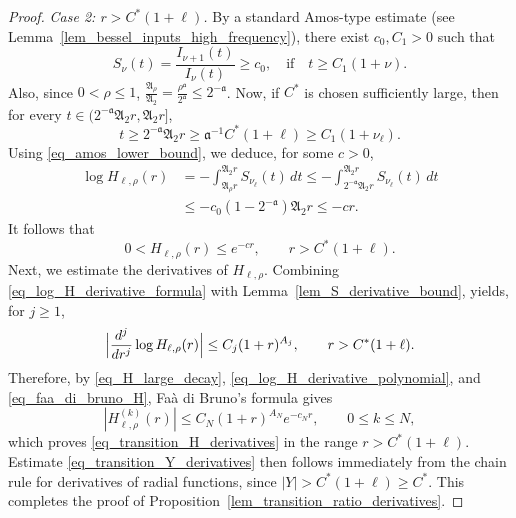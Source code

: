 \documentclass[12pt]{amsart}
\begin{document}
\begin{proof}
\textit{Case 2: $r>C^*(1+\ell)$.} By a standard Amos-type estimate \cite[Corollary~1]{KB} (see Lemma~\ref{lem_bessel_inputs_high_frequency}), there exist $c_0, C_1>0$ such that
\begin{equation}\label{eq_amos_lower_bound}
    S_\nu(t)=\frac{I_{\nu+1}(t)}{I_\nu(t)}\geq c_0,\quad \text{if}\quad t\ge C_1(1+\nu).
\end{equation}
Also, since $0<\rho\le 1$, $\frac{\mathfrak A_\rho}{\mathfrak A_2} = \frac{\rho^{\mathfrak a}}{2^{\mathfrak a}} \le 2^{-\mathfrak a}$.
Now, if $C^*$ is chosen sufficiently large, then for every
$t\in(2^{- \mathfrak a} \mathfrak A_2 r,\mathfrak A_2 r]$,
\begin{equation*}
    t\ge 2^{- \mathfrak a} \mathfrak A_2 r\ge \mathfrak a^{-1} C^*(1+\ell) \ge C_1(1+\nu_\ell).
\end{equation*}
Using \eqref{eq_amos_lower_bound}, we deduce, for some $c>0$,
\begin{align*}
\log H_{\ell,\rho}(r) &= -\int_{\mathfrak A_\rho r}^{\mathfrak A_2 r}S_{\nu_\ell}(t) \, dt
\le -\int_{2^{- \mathfrak a} \mathfrak A_2 r}^{\mathfrak A_2 r}S_{\nu_\ell}(t) \, dt \\
&\le -c_0(1-2^{- \mathfrak a})\mathfrak A_2 r \le -cr.
\end{align*}
It follows that
\begin{equation}\label{eq_H_large_decay}
    0<H_{\ell,\rho}(r)\le e^{-cr},
    \qquad
    r>C^* (1+\ell).
\end{equation}
Next, we estimate the derivatives of $H_{\ell,\rho}$. Combining \eqref{eq_log_H_derivative_formula} with Lemma~\ref{lem_S_derivative_bound}, 
yields, for $j\ge 1$,
\begin{equation}\label{eq_log_H_derivative_polynomial}
    \Bigl|
        \frac{d^j}{dr^j}\log H_{\ell,\rho}(r)
    \Bigr|
    \le
    C_j(1+r)^{A_j},
    \qquad
    r>C^*(1+\ell).
\end{equation}
Therefore, by \eqref{eq_H_large_decay}, \eqref{eq_log_H_derivative_polynomial}, and \eqref{eq_faa_di_bruno_H}, Faà di Bruno's formula gives
\begin{equation*}
    |H_{\ell,\rho}^{(k)}(r)| \le C_N (1+r)^{A_N}e^{-c_N r},\qquad 0\le k \le N,
\end{equation*}
which proves \eqref{eq_transition_H_derivatives} in the range $r>C^*(1+\ell)$. Estimate \eqref{eq_transition_Y_derivatives} then follows immediately from the chain rule for derivatives of radial functions, since $|Y|>C^*(1+\ell)\ge C^*$. This completes the proof of Proposition~\ref{lem_transition_ratio_derivatives}.
\end{proof}
\end{document}
